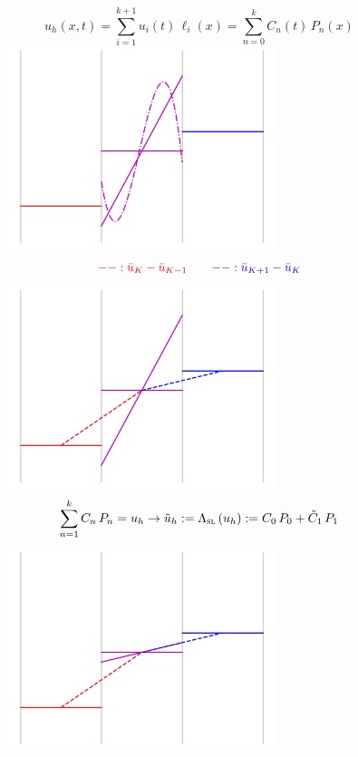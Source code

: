 \documentclass{beamer}
\begin{document}
\begin{frame}
\begin{figure}
\begin{overprint}
        $$u_{h}\left(x,t\right)
        = \sum\limits_{i=1}^{k+1} u_{i}\left(t\right) \, \ell_{i}\left(x\right)
        = \sum\limits_{n=0}^{k} C_{n}\left(t\right) \, P_{n}\left(x\right)$$
        \centering\includegraphics[width=0.7\textwidth]{./fig.sl_04.png}
        $$\textcolor{red}{--:\bar{u}_{K}-\bar{u}_{K-1}}\hspace{2em}
          \textcolor{blue}{--:\bar{u}_{K+1}-\bar{u}_{K}}$$
        \centering\includegraphics[width=0.7\textwidth]{./fig.sl_05.png}
        $$\sum\limits_{n=1}^{k}C_{n} \, P_{n} = u_{h}
        \to \tilde{u}_{h} := \Lambda_{\textsc{sl}}\left(u_{h}\right)
        := C_{0} \, P_{0} + \tilde{C}_{1} \, P_{1}$$
        \centering\includegraphics[width=0.7\textwidth]{./fig.sl_06.png}

\end{overprint}
\end{figure}
\end{frame}
\end{document}
